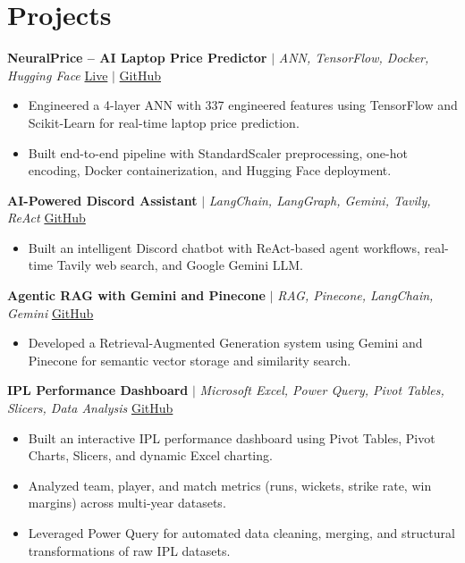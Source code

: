 \documentclass[a4paper,9pt]{article}
\newcommand{\resumeItem}[1]{\item\small #1}
\begin{document}
\vspace{-2mm}

\section{Projects}

\noindent\textbf{NeuralPrice -- AI Laptop Price Predictor} $|$ \textit{ANN, TensorFlow, Docker, Hugging Face} \hfill
\href{https://huggingface.co/spaces/Harsh0809/laptop-price-predictor-Ann}{\small Live} $|$
\href{https://github.com/hsachan295-source/Laptop-Price-Prediction-ANN}{\small GitHub}
\begin{itemize}
\resumeItem{Engineered a 4-layer ANN with 337 engineered features using TensorFlow and Scikit-Learn for real-time laptop price prediction.}
\resumeItem{Built end-to-end pipeline with StandardScaler preprocessing, one-hot encoding, Docker containerization, and Hugging Face deployment.}
\end{itemize}

\vspace{1.5pt}
\noindent\textbf{AI-Powered Discord Assistant} $|$ \textit{LangChain, LangGraph, Gemini, Tavily, ReAct} \hfill
\href{https://github.com/hsachan295-source/AI-Powered-Discord-Assistant}{\small GitHub}
\begin{itemize}
\resumeItem{Built an intelligent Discord chatbot with ReAct-based agent workflows, real-time Tavily web search, and Google Gemini LLM.}
\end{itemize}

\vspace{1.5pt}
\noindent\textbf{Agentic RAG with Gemini and Pinecone} $|$ \textit{RAG, Pinecone, LangChain, Gemini} \hfill
\href{https://github.com/hsachan295-source/Agentic-RAG-with-Gemini-and-Pinecone}{\small GitHub}
\begin{itemize}
\resumeItem{Developed a Retrieval-Augmented Generation system using Gemini and Pinecone for semantic vector storage and similarity search.}
\end{itemize}

\vspace{1.5pt}
\noindent\textbf{IPL Performance Dashboard} $|$ \textit{Microsoft Excel, Power Query, Pivot Tables, Slicers, Data Analysis} \hfill
\href{https://github.com/hsachan295-source/Power-BI-Portfolio}{\small GitHub}
\begin{itemize}
\resumeItem{Built an interactive IPL performance dashboard using Pivot Tables, Pivot Charts, Slicers, and dynamic Excel charting.}
\resumeItem{Analyzed team, player, and match metrics (runs, wickets, strike rate, win margins) across multi-year datasets.}
\resumeItem{Leveraged Power Query for automated data cleaning, merging, and structural transformations of raw IPL datasets.}
\end{itemize}
\end{document}
